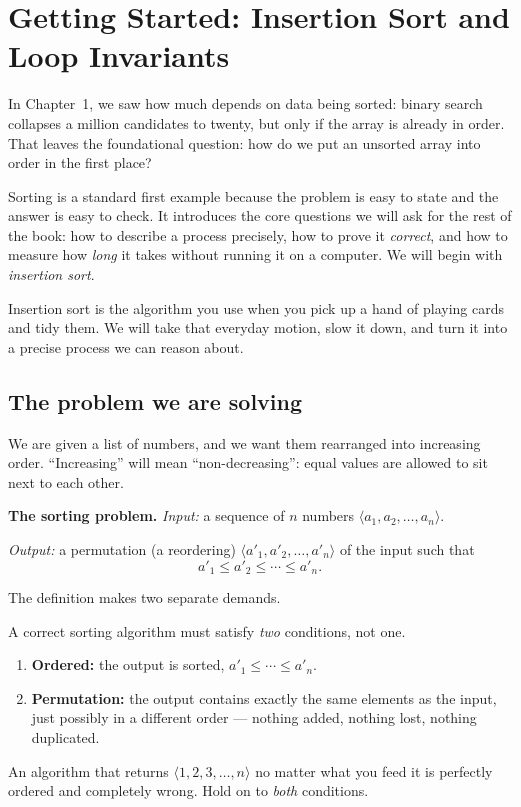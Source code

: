 \chapter{Getting Started: Insertion Sort and Loop Invariants}

In Chapter~1, we saw how much depends on data being sorted: binary search collapses
a million candidates to twenty, but only if the array is already in order. That
leaves the foundational question: how do we put an unsorted array into order in the
first place?

Sorting is a standard first example because the problem is easy to state and the answer
is easy to check. It introduces the core questions we will ask for the rest of the
book: how to describe a process precisely, how to prove it \emph{correct}, and how to
measure how \emph{long} it takes without running it on a computer. We will begin with
\emph{insertion sort}.

Insertion sort is the algorithm you use when you pick up a hand of playing cards and
tidy them. We will take that everyday motion, slow it down, and turn it into a precise
process we can reason about.

\section{The problem we are solving}

We are given a list of numbers, and we want them rearranged into increasing order.
``Increasing'' will mean ``non-decreasing'': equal values are allowed to sit next to
each other.

\begin{formalbox}
\textbf{The sorting problem.}
\emph{Input:} a sequence of $n$ numbers $\langle a_1, a_2, \dots, a_n\rangle$.

\emph{Output:} a permutation (a reordering) $\langle a'_1, a'_2, \dots, a'_n\rangle$
of the input such that
\[
a'_1 \le a'_2 \le \cdots \le a'_n .
\]
\end{formalbox}

The definition makes two separate demands.

\begin{focusbox}
A correct sorting algorithm must satisfy \emph{two} conditions, not one.
\begin{enumerate}
  \item \textbf{Ordered:} the output is sorted, $a'_1 \le \cdots \le a'_n$.
  \item \textbf{Permutation:} the output contains exactly the same elements as the
        input, just possibly in a different order --- nothing added, nothing lost,
        nothing duplicated.
\end{enumerate}
An algorithm that returns $\langle 1,2,3,\dots,n\rangle$ no matter what you feed it
is perfectly ordered and completely wrong. Hold on to \emph{both} conditions.
\end{focusbox}

